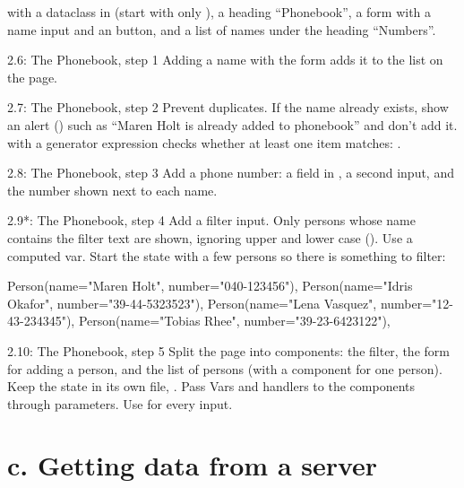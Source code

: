 with a  dataclass in  (start with only ), a heading ``Phonebook'', a form with a name input and an  button, and a list of names under the heading ``Numbers''.

\begin{exercise}{2.6: The Phonebook, step 1}
Adding a name with the form adds it to the list on the page.
\end{exercise}

\begin{exercise}{2.7: The Phonebook, step 2}
Prevent duplicates. If the name already exists, show an alert () such as ``Maren Holt is already added to phonebook'' and don't add it.  with a generator expression checks whether at least one item matches: .
\end{exercise}

\begin{exercise}{2.8: The Phonebook, step 3}
Add a phone number: a  field in , a second input, and the number shown next to each name.
\end{exercise}

\begin{exercise}{2.9*: The Phonebook, step 4}
Add a filter input. Only persons whose name contains the filter text are shown, ignoring upper and lower case (). Use a computed var. Start the state with a few persons so there is something to filter:

\begin{py}
Person(name="Maren Holt", number="040-123456"),
Person(name="Idris Okafor", number="39-44-5323523"),
Person(name="Lena Vasquez", number="12-43-234345"),
Person(name="Tobias Rhee", number="39-23-6423122"),
\end{py}
\end{exercise}

\begin{exercise}{2.10: The Phonebook, step 5}
Split the page into components: the filter, the form for adding a person, and the list of persons (with a component for one person). Keep the state in its own file, . Pass Vars and handlers to the components through parameters. Use  for every input.
\end{exercise}

\section{c. Getting data from a server}

